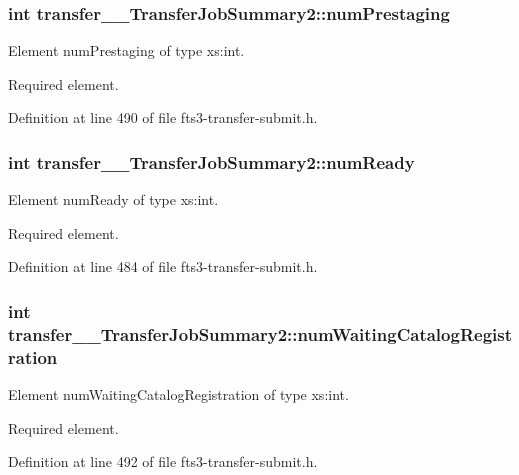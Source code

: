 \subsubsection[{numPrestaging}]{\setlength{\rightskip}{0pt plus 5cm}int {\bf transfer\_\-\_\-TransferJobSummary2::numPrestaging}}\label{classtransfer____TransferJobSummary2_a0a6d0211253302a7e9f21f78433ecdd4}


Element numPrestaging of type xs:int. 

Required element. 

Definition at line 490 of file fts3-\/transfer-\/submit.h.

\subsubsection[{numReady}]{\setlength{\rightskip}{0pt plus 5cm}int {\bf transfer\_\-\_\-TransferJobSummary2::numReady}}\label{classtransfer____TransferJobSummary2_a63dfdbbd95856fb3de0dbb1f9360d269}


Element numReady of type xs:int. 

Required element. 

Definition at line 484 of file fts3-\/transfer-\/submit.h.

\subsubsection[{numWaitingCatalogRegistration}]{\setlength{\rightskip}{0pt plus 5cm}int {\bf transfer\_\-\_\-TransferJobSummary2::numWaitingCatalogRegistration}}\label{classtransfer____TransferJobSummary2_a235738ea2a4b73483420a8969571f709}


Element numWaitingCatalogRegistration of type xs:int. 

Required element. 

Definition at line 492 of file fts3-\/transfer-\/submit.h.

